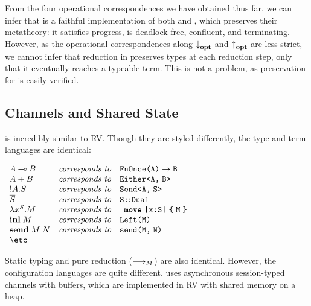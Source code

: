 \documentclass[sigplan,screen,review]{acmart}
\begin{document}
From the four operational correspondences we have obtained thus far, we can infer that \affineAGV is a faithful implementation of both \linearEGV and \affineEGV, which preserves their metatheory: it satisfies progress, is deadlock free, confluent, and terminating. However, as the operational correspondences along $\relax{{\downarrow}_{\mathbf{opt}}}\relax{}$ and $\relax{{\uparrow}_{\mathbf{opt}}}\relax{}$ are less strict, we cannot infer that reduction in \affineAGV preserves types at each reduction step, only that it eventually reaches a typeable term. This is not a problem, as preservation for \affineAGV is easily verified.

\subsection{Channels and Shared State}
\affineAGV is incredibly similar to RV. Though they are styled differently, the type and term languages are identical:
\begin{center}
  \(
  \begin{array}{lcl}
    \gvTyFun{A}{B}  & \textit{corresponds to} & \rvTyFun{A}{B}
    \\
    \gvTySum{A}{B}  & \textit{corresponds to} & \rvTySum{A}{B}
    \\
    \gvTySend{A}{S} & \textit{corresponds to} & \rvTySend{A}{S}
    \\
    \gvDual{S}      & \textit{corresponds to} & \rvDual{S}
    \\
    \gvAbs[S]{x}{M} & \textit{corresponds to} & \rvAbs[S]{x}{M}
    \\
    \gvInl{M}       & \textit{corresponds to} & \rvInl{M}
    \\
    \gvSend{M}{N}   & \textit{corresponds to} & \rvSend{M}{N}
    \\
    \text{\etc}
  \end{array}
  \)
\end{center}
Static typing and pure reduction ($\mathrel{\relax{\longrightarrow_{M}}}$) are also identical. However, the configuration languages are quite different. \affineAGV uses asynchronous session-typed channels with buffers, which are implemented in RV with shared memory on a heap.
\end{document}
